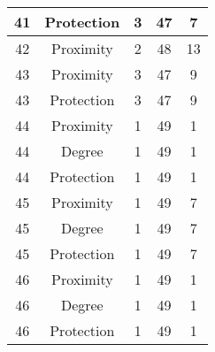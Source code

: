 \documentclass[results.tex]{subfiles}
\begin{document}
\begin{center}
\begin{tabular}{| c || c | c | c | c |}
            \hline
            41                      & Protection                   & 3                      & 47                      & 7                    \\
            \hline
            42                      & Proximity                    & 2                      & 48                      & 13                   \\
            \hline
            43                      & Proximity                    & 3                      & 47                      & 9                    \\
            \hline
            43                      & Protection                   & 3                      & 47                      & 9                    \\
            \hline
            44                      & Proximity                    & 1                      & 49                      & 1                    \\
            \hline
            44                      & Degree                       & 1                      & 49                      & 1                    \\
            \hline
            44                      & Protection                   & 1                      & 49                      & 1                    \\
            \hline
            45                      & Proximity                    & 1                      & 49                      & 7                    \\
            \hline
            45                      & Degree                       & 1                      & 49                      & 7                    \\
            \hline
            45                      & Protection                   & 1                      & 49                      & 7                    \\
            \hline
            46                      & Proximity                    & 1                      & 49                      & 1                    \\
            \hline
            46                      & Degree                       & 1                      & 49                      & 1                    \\
            \hline
            46                      & Protection                   & 1                      & 49                      & 1                    \\

\end{tabular}
\end{center}
\end{document}
